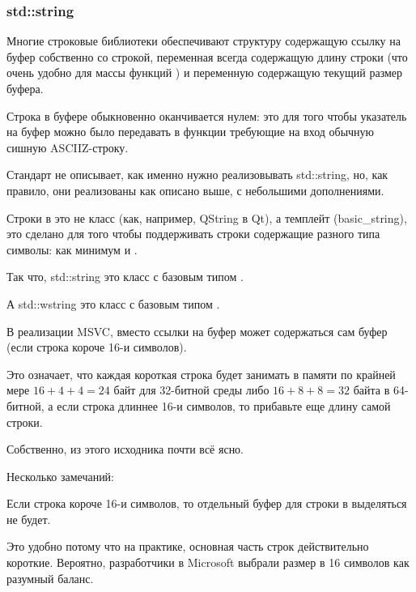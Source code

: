 \subsubsection{std::string}
\label{std_string}


Многие строковые библиотеки  обеспечивают структуру содержащую ссылку 
на буфер собственно со строкой, переменная всегда содержащую длину строки 
(что очень удобно для массы функций ) и переменную содержащую текущий размер буфера.

Строка в буфере обыкновенно оканчивается нулем: это для того чтобы указатель на буфер можно было
передавать в функции требующие на вход обычную сишную \ac{ASCIIZ}-строку.

Стандарт \Cpp не описывает, как именно нужно реализовывать std::string,
но, как правило, они реализованы как описано выше, с небольшими дополнениями.

Строки в \Cpp это не класс (как, например, QString в Qt), а темплейт (basic\_string), 
это сделано для того чтобы поддерживать 
строки содержащие разного типа символы: как минимум \Tchar и .

Так что, std::string это класс с базовым типом \Tchar.

А std::wstring это класс с базовым типом .


В реализации MSVC, вместо ссылки на буфер может содержаться сам буфер (если строка короче 16-и символов).

Это означает, что каждая короткая строка будет занимать в памяти по крайней мере $16 + 4 + 4 = 24$ 
байт для 32-битной среды либо $16 + 8 + 8 = 32$ 
байта в 64-битной, а если строка длиннее 16-и символов, то прибавьте еще длину самой строки.



Собственно, из этого исходника почти всё ясно.

Несколько замечаний:

Если строка короче 16-и символов, 
то отдельный буфер для строки в  выделяться не будет.

Это удобно потому что на практике, основная часть строк действительно короткие.
Вероятно, разработчики в Microsoft выбрали размер в 16 символов как разумный баланс.

